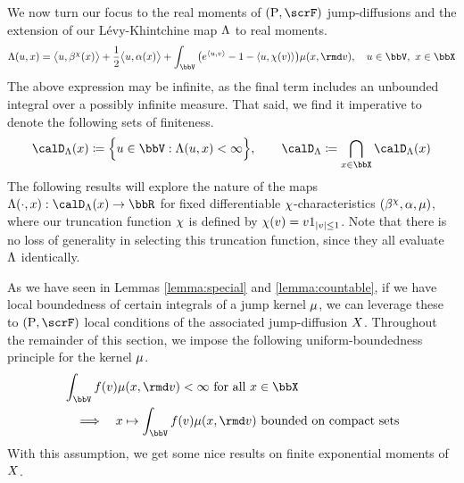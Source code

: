 We now turn our focus to the real moments of $(\Prb, \scrF)$ jump-diffusions and the extension of our L\'evy-Khintchine map $\Lambda$ to real moments.
\begin{equation*}
  \ode(\momentVar, \stateVar) = \bprj{\momentVar}{\affDrift^\trunc(\stateVar)} + \frac12\bprj{\momentVar}{\affDiff(\stateVar)} + \int_\vecSpace \big( e^\prj{\momentVar}{\markVar} - 1 - \prj{\momentVar}{\trunc(\markVar)} \big) \affJump(\stateVar, \rmd\markVar), \quad \momentVar \in \vecSpace, ~ \stateVar \in \stateSpace
\end{equation*}
The above expression may be infinite, as the final term includes an unbounded integral over a possibly infinite measure.
That said, we find it imperative to denote the following sets of finiteness.
\begin{equation}
  \label{eq:odeSpace-general}
  \odeSpace(\stateVar) \defeq \Big\{ \momentVar \in \vecSpace : \ode(\momentVar, \stateVar) < \infty \Big\}, \qquad
  \odeSpace \defeq \bigcap_{\stateVar \in \stateSpace} \odeSpace(\stateVar)
\end{equation}
The following results will explore the nature of the maps $\ode(\cdot,\stateVar): \odeSpace(\stateVar) \rightarrow \bbR$ for fixed differentiable $\chi$-characteristics $(\beta^\chi, \alpha, \mu)$, where our truncation function $\chi$ is defined by $\chi(v) = v 1_{|v|\leq 1}$.
Note that there is no loss of generality in selecting this truncation function, since they all evaluate $\Lambda$ identically.





As we have seen in Lemmas \ref{lemma:special} and \ref{lemma:countable}, if we have local boundedness of certain integrals of a jump kernel $\mu$, we can leverage these to $(\Prb, \scrF)$ local conditions of the associated jump-diffusion $X$.
Throughout the remainder of this section, we impose the following uniform-boundedness principle for the kernel $\mu$.
\begin{equation}
  \label{eq:affJump-regularity}
  \begin{aligned}
    &\int_\vecSpace f(\markVar) \affJump(\stateVar, \rmd\markVar) < \infty \text{ for all } \stateVar \in \stateSpace \\
    &\quad\Longrightarrow\quad \stateVar \mapsto \int_\vecSpace f(\markVar) \affJump(\stateVar, \rmd\markVar) \text{ bounded on compact sets}
  \end{aligned}
\end{equation}
With this assumption, we get some nice results on finite exponential moments of $X$.






